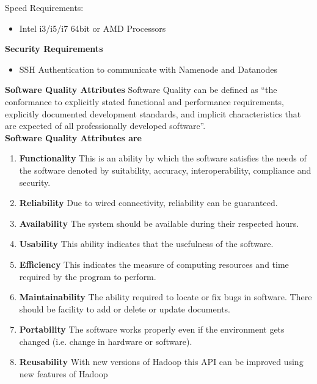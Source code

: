 \documentclass[oneside,a4paper,12pt]{report}
\begin{document}
Speed Requirements:
\begin{itemize}
\item Intel i3/i5/i7 64bit or AMD Processors
\end{itemize}

\noindent \textbf{Security Requirements}
\begin{itemize}
\item SSH Authentication to communicate with Namenode and Datanodes
\end{itemize}

\noindent \textbf{Software Quality Attributes}
Software Quality can be defined as “the conformance to explicitly stated functional and performance requirements, explicitly documented development standards, and implicit characteristics that are expected of all professionally developed software”.\\
	
\noindent \textbf{Software Quality Attributes are}

\begin{enumerate}
\item \textbf{Functionality}
This is an ability by which the software satisfies the needs of the software denoted by suitability, accuracy, interoperability, compliance and security.

\item \textbf{Reliability}
Due to wired connectivity, reliability can be guaranteed.

\item \textbf{Availability}
The system should be available during their respected hours.

\item \textbf{Usability}
This ability indicates that the usefulness of the software.

\item \textbf{Efficiency}
This indicates the measure of computing resources and time required by the program to perform.

\item \textbf{Maintainability}
The ability required to locate or fix bugs in software. There should be facility to add or delete or update documents.

\item \textbf{Portability}
The software works properly even if the environment gets changed (i.e. change in hardware or software).

\item \textbf{Reusability}
With new versions of Hadoop this API can be improved using new features of Hadoop
\end{enumerate}
\end{document}
